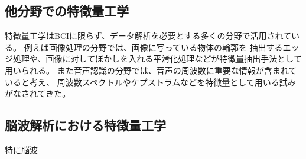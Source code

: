 \subsection{他分野での特徴量工学}
特徴量工学はBCIに限らず、データ解析を必要とする多くの分野で活用されている。
例えば画像処理の分野では、画像に写っている物体の輪郭を
抽出するエッジ処理や、画像に対してぼかしを入れる平滑化処理などが特徴量抽出手法として用いられる。
また音声認識の分野では、音声の周波数に重要な情報が含まれていると考え、
周波数スペクトルやケプストラムなどを特徴量として用いる試みがなされてきた。

\subsection{脳波解析における特徴量工学}
特に脳波











